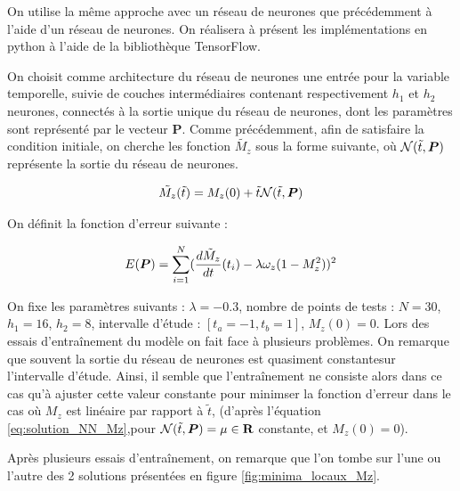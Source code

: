 \documentclass[12pt]{report}
\begin{document}
On utilise la même approche avec un réseau de neurones que précédemment à l'aide d'un réseau de neurones.
On réalisera à présent les implémentations en python à l'aide de la bibliothèque TensorFlow.

On choisit comme architecture du réseau de neurones une entrée pour la variable temporelle, suivie de couches intermédiaires contenant respectivement $h_1$ et $h_2$ neurones, connectés à la sortie unique du réseau de neurones, dont les paramètres sont représenté par le vecteur $\bm{P}$.
Comme précédemment, afin de satisfaire la condition initiale, on cherche les fonction $\tilde{M_z}$ sous la forme suivante, où ${\mathcal{N}}(\Tilde{t},\bm{P})$ représente la sortie du réseau de neurones.

\begin{equation}
    \Tilde{M_z}(\Tilde{t}) = M_z(0) +\Tilde{t} {\mathcal{N}}(\Tilde{t},\bm{P})
    \label{eq:solution_NN_Mz}
\end{equation}

On définit la fonction d'erreur suivante :

\begin{equation}
    E(\bm{P}) = \sum_{i=1}^{N} (\frac{d\Tilde{M}_z}{dt}(t_i) - \lambda\omega_z (1-M_z^2) )^2
\label{eq:erreur_Mz}
\end{equation}

On fixe les paramètres suivants : $\lambda = -0.3$, nombre de points de tests : $N=30$, $h_1 = 16$, $h_2 = 8$, intervalle d'étude : $[t_a = -1, t_b = 1]$, $M_z(0) = 0$.
Lors des essais d'entraînement du modèle on fait face à plusieurs problèmes.
On remarque que souvent la sortie du réseau de neurones est quasiment constantesur l'intervalle d'étude.
Ainsi, il semble que l'entraînement ne consiste alors dans ce cas qu'à ajuster cette valeur constante pour minimser la fonction d'erreur dans le cas où $M_z$ est linéaire par rapport à $\tilde{t}$, (d'après l'équation \ref{eq:solution_NN_Mz},pour ${\mathcal{N}}(\Tilde{t},\bm{P}) = \mu\in \mathbf{R}$ constante, et $M_z(0) = 0$).

Après plusieurs essais d'entraînement, on remarque que l'on tombe sur l'une ou l'autre des 2 solutions présentées en figure \ref{fig:minima_locaux_Mz}.
\end{document}
